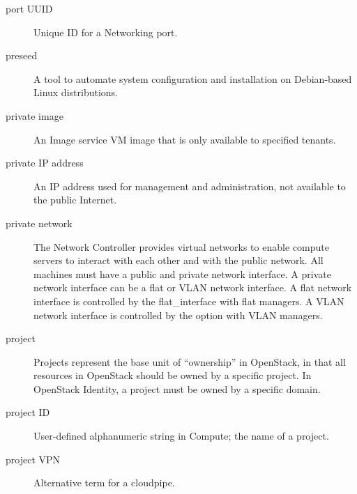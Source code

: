 \documentclass[letterpaper,10pt,english]{sphinxmanual}
\begin{document}
\begin{description}
\item[{port UUID}] \leavevmode{}\label{_source/glossary:term-port-uuid}
Unique ID for a Networking port.

\item[{preseed}] \leavevmode{}\label{_source/glossary:term-preseed}
A tool to automate system configuration and installation on
Debian-based Linux distributions.

\item[{private image}] \leavevmode{}\label{_source/glossary:term-private-image}
An Image service VM image that is only available to specified
tenants.

\item[{private IP address}] \leavevmode{}\label{_source/glossary:term-private-ip-address}
An IP address used for management and administration, not
available to the public Internet.

\item[{private network}] \leavevmode{}\label{_source/glossary:term-private-network}
The Network Controller provides virtual networks to enable
compute servers to interact with each other and with the public
network. All machines must have a public and private network
interface. A private network interface can be a flat or VLAN network
interface. A flat network interface is controlled by the
flat\_interface with flat managers. A VLAN network interface is
controlled by the  option with VLAN
managers.

\item[{project}] \leavevmode{}\label{_source/glossary:term-project}
Projects represent the base unit of “ownership” in OpenStack,
in that all resources in OpenStack should be owned by a specific project.
In OpenStack Identity, a project must be owned by a specific domain.

\item[{project ID}] \leavevmode{}\label{_source/glossary:term-project-id}
User-defined alphanumeric string in Compute; the name of a
project.

\item[{project VPN}] \leavevmode{}\label{_source/glossary:term-project-vpn}
Alternative term for a cloudpipe.


\end{description}
\end{document}
